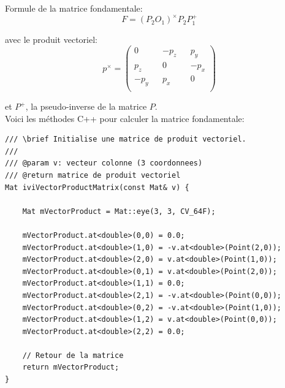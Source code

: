 \documentclass[a4paper,11pt]{article}
\begin{document}
Formule de la matrice fondamentale:
$$
F = (P_2 O_1)^{\times} P_2 P_1^+
$$

avec le produit vectoriel:
$$
p^{\times} = 
\begin{pmatrix}
  0 && -p_z && p_y \\
  p_z && 0 && -p_x \\
  -p_y && p_x && 0 \\
\end{pmatrix}
$$

et $P^+$, la pseudo-inverse de la matrice $P$.\\

Voici les méthodes C++ pour calculer la matrice fondamentale:

\begin{lstlisting}[caption=Fonction qui calcule le produit vectoriel]
/// \brief Initialise une matrice de produit vectoriel.
///
/// @param v: vecteur colonne (3 coordonnees)
/// @return matrice de produit vectoriel
Mat iviVectorProductMatrix(const Mat& v) {

    Mat mVectorProduct = Mat::eye(3, 3, CV_64F);

    mVectorProduct.at<double>(0,0) = 0.0;
    mVectorProduct.at<double>(1,0) = -v.at<double>(Point(2,0));
    mVectorProduct.at<double>(2,0) = v.at<double>(Point(1,0));
    mVectorProduct.at<double>(0,1) = v.at<double>(Point(2,0));
    mVectorProduct.at<double>(1,1) = 0.0;
    mVectorProduct.at<double>(2,1) = -v.at<double>(Point(0,0));
    mVectorProduct.at<double>(0,2) = -v.at<double>(Point(1,0));
    mVectorProduct.at<double>(1,2) = v.at<double>(Point(0,0));
    mVectorProduct.at<double>(2,2) = 0.0;

    // Retour de la matrice
    return mVectorProduct;
}
\end{lstlisting}
\end{document}
